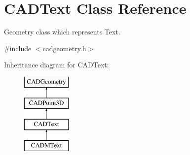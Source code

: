 \hypertarget{class_c_a_d_text}{}\section{C\+A\+D\+Text Class Reference}
\label{class_c_a_d_text}


Geometry class which represents Text.  




{\ttfamily \#include $<$cadgeometry.\+h$>$}

Inheritance diagram for C\+A\+D\+Text\+:\begin{figure}[H]
\begin{center}
\leavevmode
\includegraphics[height=4.000000cm]{class_c_a_d_text}
\end{center}
\end{figure}
